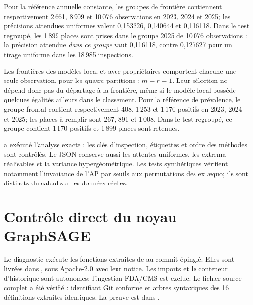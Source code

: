 Pour la référence annuelle constante, les groupes de frontière contiennent respectivement 2\,661, 8\,909 et 10\,076 observations en 2023, 2024 et 2025; les précisions attendues uniformes valent 0,153326, 0,140644 et 0,116118. Dans le test regroupé, les 1\,899 places sont prises dans le groupe 2025 de 10\,076 observations : la précision attendue \emph{dans ce groupe} vaut 0,116118, contre 0,127627 pour un tirage uniforme dans les 18\,985 inspections.

Les frontières des modèles local et avec propriétaires comportent chacune une seule observation, pour les quatre partitions : $m=r=1$. Leur sélection ne dépend donc pas du départage à la frontière, même si le modèle local possède quelques égalités ailleurs dans le classement. Pour la référence de prévalence, le groupe frontal contient respectivement 408, 1\,253 et 1\,170 positifs en 2023, 2024 et 2025; les places à remplir sont 267, 891 et 1\,008. Dans le test regroupé, ce groupe contient 1\,170 positifs et 1\,899 places sont retenues.

 a exécuté l'analyse exacte : les clés d'inspection, étiquettes et ordre des méthodes sont contrôlés. Le JSON conserve aussi les attentes uniformes, les extrema réalisables et la variance hypergéométrique. Les tests synthétiques vérifient notamment l'invariance de l'AP par seuils aux permutations des ex æquo; ils sont distincts du calcul sur les données réelles.

\begin{table}[!htbp]\centering\small
\caption{Frontières observées : $m$ observations à égalité, $t$ positives, $r$ places retenues. $P_{\mathrm{hist}}$ est la précision historique et $\mathbb{E}[P_{\text{frontière}}]$ celle attendue sous sélection uniforme dans le seul groupe frontal.}

\end{table}

\par{}
\section{Contrôle direct du noyau GraphSAGE}
\label{supp:graphsage}
Le diagnostic  exécute les fonctions extraites de  au commit épinglé\cite{hgbcode}. Elles sont livrées dans , sous Apache-2.0 avec leur notice. Les imports et le conteneur d'historique sont autonomes; l'ingestion FDA/CMS est exclue. Le fichier source complet a été vérifié : identifiant Git  conforme et arbres syntaxiques des 16 définitions extraites identiques. La preuve est dans .

